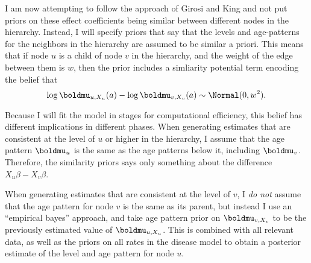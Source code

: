 I am now attempting to follow the approach of Girosi and King and not
put priors on these effect coefficients being similar between
different nodes in the hierarchy.  Instead, I will specify priors that
say that the levels and age-patterns for the neighbors in the
hierarchy are assumed to be similar a priori.  This means that if node
$u$ is a child of node $v$ in the hierarchy, and the weight of the
edge between them is $w$, then the prior includes a simliarity
potential term encoding the belief that
\[
\log \boldmu_{u,X_u}(a) - \log \boldmu_{v,X_v}(a) \sim \Normal(0, w^2).
\]

Because I will fit the model in stages for computational efficiency,
this belief has different implications in different phases.  When
generating estimates that are consistent at the level of $u$ or higher
in the hierarchy, I assume that the age pattern $\boldmu_u$ is the
same as the age patterns below it, including $\boldmu_v$.  Therefore,
the similarity priors says only something about the difference
$X_u\beta - X_v\beta$.

When generating estimates that are consistent at the level of $v$, I
\emph{do not} assume that the age pattern for node $v$ is the same as
its parent, but instead I use an ``empirical bayes'' approach, and
take age pattern prior on $\boldmu_{v,X_v}$ to be the previously
estimated value of $\boldmu_{u,X_u}$.  This is combined with all
relevant data, as well as the priors on all rates in the disease model
to obtain a posterior estimate of the level and age pattern for node
$u$.
